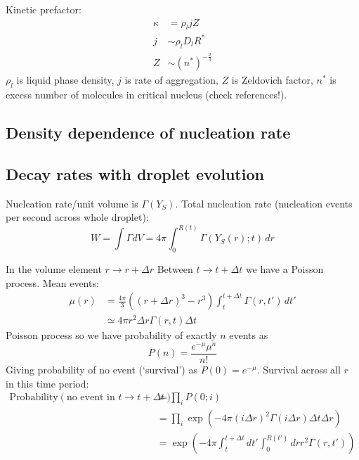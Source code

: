\documentclass[12pt,twoside]{report}
\begin{document}
Kinetic prefactor:
\begin{align}
  \kappa &= \rho_l j Z \\
  j &\sim \rho_l D_l R^* \\
  Z &\sim (n^*)^{-\tfrac{2}{3}}
\end{align}
$\rho_l$ is liquid phase density, $j$ is rate of aggregation, $Z$ is Zeldovich factor, $n^*$ is excess number of molecules in critical nucleus (check references!).

\subsection{Density dependence of nucleation rate}
\subsection{Decay rates with droplet evolution}

Nucleation rate/unit volume is $\Gamma(Y_S)$.
Total nucleation rate (nucleation events per second across whole droplet):
\begin{equation}
  W = \int \Gamma dV
  = 4\pi \int_0^{R(t)} \Gamma(Y_S(r); t) \, dr
\end{equation}

In the volume element $r \to r + \Delta r$ Between $t \to t+\Delta t$ we have a Poisson process.
Mean events:
\begin{equation}
  \begin{aligned}
    \mu(r) &= \frac{4\pi}{3} ( (r+\Delta r)^3 - r^3)
    \int_t^{t+\Delta t} \Gamma(r,t') \, dt' \\
    &\simeq
    4\pi r^2 \Delta r \Gamma(r, t) \Delta t
  \end{aligned}
\end{equation}
Poisson process so we have probability of exactly $n$ events as
\begin{equation}
  P(n) = \frac{e^{-\mu} \mu^n}{n!}
\end{equation}
Giving probability of no event (`survival') as $P(0) = e^{-\mu}$.
Survival across all $r$ in this time period:
\begin{equation}
  \begin{aligned}
  \textrm{Probability}\left( \textrm{no event in } t \to t + \Delta t \right)
  &= \prod_i P(0;i) \\
  &= \prod_i \exp{\left(-4\pi (i\Delta r)^2 \Gamma(i\Delta r) \Delta t \Delta r\right)} \\
  &= \exp{\left(
    -4\pi \int_t^{t+\Delta t} dt' \int_0^{R(t')} dr r^2 \Gamma(r, t')
    \right)}
  \end{aligned}
\end{equation}
\end{document}
